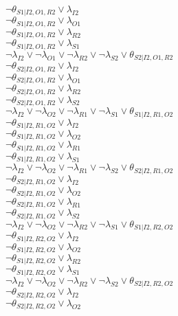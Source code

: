 $\neg\theta_{S1|I2,O1,R2} \vee \lambda_{I2}$\\
$\neg\theta_{S1|I2,O1,R2} \vee \lambda_{O1}$\\
$\neg\theta_{S1|I2,O1,R2} \vee \lambda_{R2}$\\
$\neg\theta_{S1|I2,O1,R2} \vee \lambda_{S1}$\\
$\neg\lambda_{I2} \vee \neg\lambda_{O1} \vee \neg\lambda_{R2} \vee \neg\lambda_{S2} \vee \theta_{S2|I2,O1,R2}$\\
$\neg\theta_{S2|I2,O1,R2} \vee \lambda_{I2}$\\
$\neg\theta_{S2|I2,O1,R2} \vee \lambda_{O1}$\\
$\neg\theta_{S2|I2,O1,R2} \vee \lambda_{R2}$\\
$\neg\theta_{S2|I2,O1,R2} \vee \lambda_{S2}$\\
$\neg\lambda_{I2} \vee \neg\lambda_{O2} \vee \neg\lambda_{R1} \vee \neg\lambda_{S1} \vee \theta_{S1|I2,R1,O2}$\\
$\neg\theta_{S1|I2,R1,O2} \vee \lambda_{I2}$\\
$\neg\theta_{S1|I2,R1,O2} \vee \lambda_{O2}$\\
$\neg\theta_{S1|I2,R1,O2} \vee \lambda_{R1}$\\
$\neg\theta_{S1|I2,R1,O2} \vee \lambda_{S1}$\\
$\neg\lambda_{I2} \vee \neg\lambda_{O2} \vee \neg\lambda_{R1} \vee \neg\lambda_{S2} \vee \theta_{S2|I2,R1,O2}$\\
$\neg\theta_{S2|I2,R1,O2} \vee \lambda_{I2}$\\
$\neg\theta_{S2|I2,R1,O2} \vee \lambda_{O2}$\\
$\neg\theta_{S2|I2,R1,O2} \vee \lambda_{R1}$\\
$\neg\theta_{S2|I2,R1,O2} \vee \lambda_{S2}$\\
$\neg\lambda_{I2} \vee \neg\lambda_{O2} \vee \neg\lambda_{R2} \vee \neg\lambda_{S1} \vee \theta_{S1|I2,R2,O2}$\\
$\neg\theta_{S1|I2,R2,O2} \vee \lambda_{I2}$\\
$\neg\theta_{S1|I2,R2,O2} \vee \lambda_{O2}$\\
$\neg\theta_{S1|I2,R2,O2} \vee \lambda_{R2}$\\
$\neg\theta_{S1|I2,R2,O2} \vee \lambda_{S1}$\\
$\neg\lambda_{I2} \vee \neg\lambda_{O2} \vee \neg\lambda_{R2} \vee \neg\lambda_{S2} \vee \theta_{S2|I2,R2,O2}$\\
$\neg\theta_{S2|I2,R2,O2} \vee \lambda_{I2}$\\
$\neg\theta_{S2|I2,R2,O2} \vee \lambda_{O2}$\\
